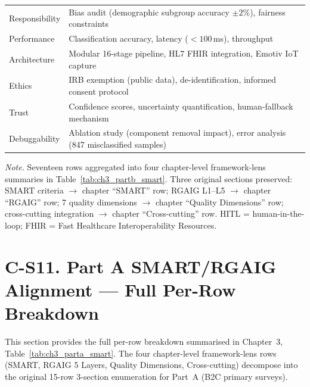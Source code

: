 {\begin{xltabular}{\textwidth}{@{} >{\raggedright\arraybackslash}p{2.0cm} L @{}}
Responsibility & Bias audit (demographic subgroup accuracy $\pm 2\%$), fairness constraints \\
Performance & Classification accuracy, latency ($< 100$\,ms), throughput \\
Architecture & Modular 16-stage pipeline, HL7 FHIR integration, Emotiv IoT capture \\
Ethics & IRB exemption (public data), de-identification, informed consent protocol \\
Trust & Confidence scores, uncertainty quantification, human-fallback mechanism \\
Debuggability & Ablation study (component removal impact), error analysis (847 misclassified samples) \\
\end{xltabular}}
\vspace{0.4em}
\noindent\textit{Note.} Seventeen rows aggregated into four chapter-level framework-lens summaries in Table~\ref{tab:ch3_partb_smart}. Three original sections preserved: SMART criteria $\to$ chapter ``SMART'' row; RGAIG L1--L5 $\to$ chapter ``RGAIG'' row; 7 quality dimensions $\to$ chapter ``Quality Dimensions'' row; cross-cutting integration $\to$ chapter ``Cross-cutting'' row. HITL = human-in-the-loop; FHIR = Fast Healthcare Interoperability Resources.

\section*{C-S11. Part A SMART/RGAIG Alignment --- Full Per-Row Breakdown}
\label{sec:appc_parta_smart_full}

\noindent This section provides the full per-row breakdown summarised in Chapter~3, Table~\ref{tab:ch3_parta_smart}. The four chapter-level framework-lens rows (SMART, RGAIG 5 Layers, Quality Dimensions, Cross-cutting) decompose into the original 15-row 3-section enumeration for Part~A (B2C primary surveys).

